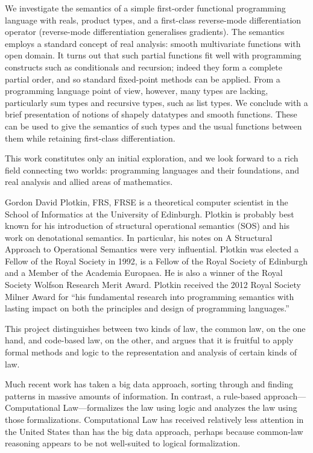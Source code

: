 We investigate the semantics of a simple first-order functional
programming language with reals, product types, and a first-class
reverse-mode differentiation operator (reverse-mode differentiation
generalises gradients). The semantics employs a standard concept of
real analysis: smooth multivariate functions with open domain. It
turns out that such partial functions fit well with programming
constructs such as conditionals and recursion; indeed they form a
complete partial order, and so standard fixed-point methods can be
applied.  From a programming language point of view, however, many
types are lacking, particularly sum types and recursive types, such
as list types. We conclude with a brief presentation of notions of
shapely datatypes and smooth functions. These can be used to give the
semantics of such types and the usual functions between them while
retaining first-class differentiation.

This work constitutes only an initial exploration, and we look forward
to a rich field connecting two worlds: programming languages and their
foundations, and real analysis and allied areas of mathematics.

\bio
Gordon David Plotkin, FRS, FRSE is a theoretical
computer scientist in the School of Informatics at the University of Edinburgh.
Plotkin is probably best known for his introduction of structural operational
semantics (SOS) and his work on denotational semantics. In particular, his notes
on A Structural Approach to Operational Semantics were very influential.
Plotkin was elected a Fellow of the Royal Society in 1992, is a Fellow of the
Royal Society of Edinburgh and a Member of the Academia Europaea. He is also a
winner of the Royal Society Wolfson Research Merit Award. Plotkin received the
2012 Royal Society Milner Award for ``his fundamental research into programming
semantics with lasting impact on both the principles and design of programming
languages.''

\newpage



\talkabstract
This project distinguishes between two kinds of law, the common law,
on the one hand, and code-based law, on the other, and argues that it
is fruitful to apply formal methods and logic to the representation
and analysis of certain kinds of law.

Much recent work has taken a big data approach, sorting through and
finding patterns in massive amounts of information. In contrast, a
rule-based approach---Computational Law---formalizes the law using
logic and analyzes the law using those formalizations. Computational
Law has received relatively less attention in the United States than
has the big data approach, perhaps because common-law reasoning
appears to be not well-suited to logical formalization.

